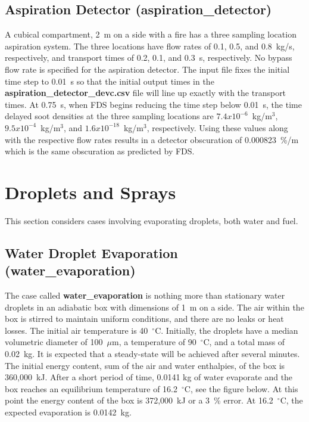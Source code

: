 \documentclass[11pt]{book}
\begin{document}
\subsection{Aspiration Detector ({\bf aspiration\_detector}) }

A cubical compartment, 2~m on a side with a fire has a three sampling location aspiration system.  The three locations
have flow rates of 0.1, 0.5, and 0.8~kg/s, respectively, and transport times of 0.2, 0.1, and 0.3~s, respectively.  No bypass flow rate is
specified for the aspiration detector.  The input file fixes the initial time step to 0.01~s so that the initial output
times in the {\bf aspiration\_detector\_devc.csv} file will line up exactly with the transport times.  At 0.75~s, when
FDS begins reducing the time step below 0.01~s, the time delayed soot densities at the three sampling locations are
$7.4x10^{-6}$~kg/m$^3$, $9.5x10^{-4}$~kg/m$^3$, and $1.6x10^{-18}$~kg/m$^3$, respectively.  Using these values along with the
respective flow rates results in a detector obscuration of 0.000823~\%/m which is the same obscuration as predicted by FDS.

\clearpage

\section{Droplets and Sprays}

This section considers cases involving evaporating droplets, both water and fuel.


\subsection{Water Droplet Evaporation ({\bf water\_evaporation}) }

The case called {\bf water\_evaporation} is nothing more than stationary water droplets in an adiabatic box with dimensions of 1~m on a side. The air
within the box is stirred to maintain uniform conditions, and there are no leaks or heat losses. The initial air
 temperature is 40~$^\circ$C.
Initially, the droplets have a median volumetric diameter of 100~$\mu$m, a temperature of 90~$^\circ$C, and a total mass of 0.02~kg.
It is expected that a steady-state will be achieved after several minutes.  The initial energy content, sum of the
air and water enthalpies, of the box is 360,000~kJ.  After a short period of time, 0.0141 kg of water evaporate and the box
reaches an equilibrium temperature of 16.2~$^\circ$C, see the figure below.  At this point the energy content of the box is 372,000~kJ
 or a 3~\% error.  At 16.2~$^\circ$C, the expected evaporation is 0.0142~kg.
\end{document}
